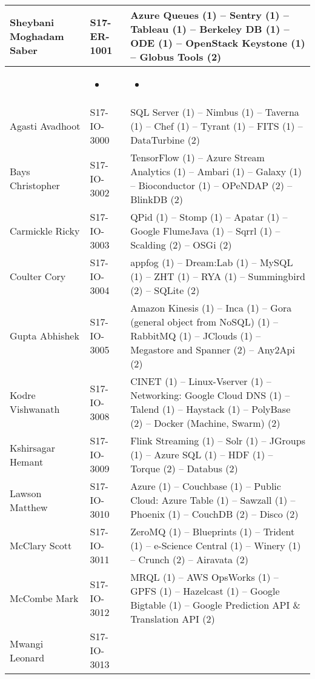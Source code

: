 \begin{longtable}{|*{3}{p{}|}}
Sheybani Moghadam	Saber
&
S17-ER-1001
&
Azure Queues (1) -- Sentry (1) -- Tableau (1) -- Berkeley DB (1) -- ODE (1) -- OpenStack Keystone (1) -- Globus Tools (2)
\\
\hline&\begin{itemize}
\item {} 
\end{itemize}
&\begin{itemize}
\item {} 
\end{itemize}
\\
\hline
Agasti	Avadhoot
&
S17-IO-3000
&
SQL Server (1) -- Nimbus (1) -- Taverna (1) -- Chef (1) -- Tyrant (1) -- FITS (1) -- DataTurbine (2)
\\
\hline
Bays	Christopher
&
S17-IO-3002
&
TensorFlow (1) -- Azure Stream Analytics (1) -- Ambari (1) -- Galaxy (1) -- Bioconductor (1) -- OPeNDAP (2) -- BlinkDB (2)
\\
\hline
Carmickle	Ricky
&
S17-IO-3003
&
QPid (1) -- Stomp (1) -- Apatar (1) -- Google FlumeJava (1) -- Sqrrl (1) -- Scalding (2) -- OSGi (2)
\\
\hline
Coulter	Cory
&
S17-IO-3004
&
appfog (1) -- Dream:Lab (1) -- MySQL (1) -- ZHT (1) -- RYA (1) -- Summingbird (2) -- SQLite (2)
\\
\hline
Gupta	Abhishek
&
S17-IO-3005
&
Amazon Kinesis (1) -- Inca (1) -- Gora (general object from NoSQL) (1) -- RabbitMQ (1) -- JClouds (1) -- Megastore and Spanner (2) -- Any2Api (2)
\\
\hline
Kodre	Vishwanath
&
S17-IO-3008
&
CINET (1) -- Linux-Vserver (1) -- Networking: Google Cloud DNS (1) -- Talend (1) -- Haystack (1) -- PolyBase (2) -- Docker (Machine, Swarm) (2)
\\
\hline
Kshirsagar	Hemant
&
S17-IO-3009
&
Flink Streaming (1) -- Solr (1) -- JGroups (1) -- Azure SQL (1) -- HDF (1) -- Torque (2) -- Databus (2)
\\
\hline
Lawson	Matthew
&
S17-IO-3010
&
Azure (1) -- Couchbase (1) -- Public Cloud: Azure Table (1) -- Sawzall (1) -- Phoenix (1) -- CouchDB (2) -- Disco (2)
\\
\hline
McClary	Scott
&
S17-IO-3011
&
ZeroMQ (1) -- Blueprints (1) -- Trident (1) -- e-Science Central (1) -- Winery (1) -- Crunch (2) -- Airavata (2)
\\
\hline
McCombe	Mark
&
S17-IO-3012
&
MRQL (1) -- AWS OpsWorks (1) -- GPFS (1) -- Hazelcast (1) -- Google Bigtable (1) -- Google Prediction API \& Translation API (2)
\\
\hline
Mwangi	Leonard
&
S17-IO-3013

\end{longtable}
